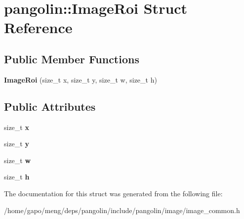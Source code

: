 \hypertarget{structpangolin_1_1_image_roi}{}\section{pangolin\+:\+:Image\+Roi Struct Reference}
\label{structpangolin_1_1_image_roi}
\subsection*{Public Member Functions}
\begin{DoxyCompactItemize}
\item 
{\bfseries Image\+Roi} (size\+\_\+t x, size\+\_\+t y, size\+\_\+t w, size\+\_\+t h)\hypertarget{structpangolin_1_1_image_roi_aec3d389f6ac61a466f149312d476ba91}{}\label{structpangolin_1_1_image_roi_aec3d389f6ac61a466f149312d476ba91}

\end{DoxyCompactItemize}
\subsection*{Public Attributes}
\begin{DoxyCompactItemize}
\item 
size\+\_\+t {\bfseries x}\hypertarget{structpangolin_1_1_image_roi_a067742f59f0a358f452306400281ba39}{}\label{structpangolin_1_1_image_roi_a067742f59f0a358f452306400281ba39}

\item 
size\+\_\+t {\bfseries y}\hypertarget{structpangolin_1_1_image_roi_ab853dff8d544c0da928e6d5f09df77b9}{}\label{structpangolin_1_1_image_roi_ab853dff8d544c0da928e6d5f09df77b9}

\item 
size\+\_\+t {\bfseries w}\hypertarget{structpangolin_1_1_image_roi_a06209a3b42cfe998f109e23464a2283a}{}\label{structpangolin_1_1_image_roi_a06209a3b42cfe998f109e23464a2283a}

\item 
size\+\_\+t {\bfseries h}\hypertarget{structpangolin_1_1_image_roi_a39dae76e7badc4be12e1fc14948b7cb3}{}\label{structpangolin_1_1_image_roi_a39dae76e7badc4be12e1fc14948b7cb3}

\end{DoxyCompactItemize}


The documentation for this struct was generated from the following file\+:\begin{DoxyCompactItemize}
\item 
/home/gapo/meng/deps/pangolin/include/pangolin/image/image\+\_\+common.\+h\end{DoxyCompactItemize}
